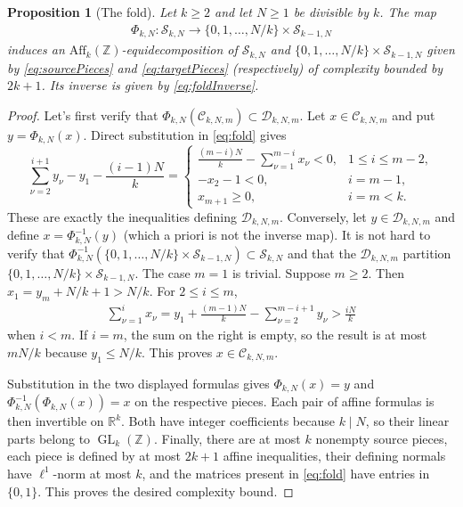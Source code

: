 \documentclass[a4paper,reqno,12pt]{amsart}
\theoremstyle{plain}
\newtheorem{proposition}[theorem]{Proposition}
\theoremstyle{plain}
\theoremstyle{remark}
\theoremstyle{plain}
\newcommand{\C}{\mathscr{C}}
\newcommand{\D}{\mathscr{D}}
\newcommand{\cS}{\mathscr{S}}
\newcommand{\RR}{\mathbb{R}}
\newcommand{\aff}{\text{Aff}}
\newcommand{\GL}{\operatorname{GL}}
\newcommand{\Z}{\mathbb{Z}}
\theoremstyle{plain}
\theoremstyle{plain}
\begin{document}
{{\begin{proposition}[The fold]\label{prop:fold}
{Let $k\geq2$ and let $N\geq1$ be divisible by $k$.}
The map
\begin{align*}
 \Phi_{k,N}:\cS_{k,N}
 \longrightarrow
 \{0,1,\ldots,N/k\}\times
{\cS_{k-1,N}}
\end{align*}
induces an $\aff_k(\Z)$-equidecomposition of $\cS_{k,N}$ and $ \{0,1,\ldots,N/k\}\times \cS_{k-1,N}$ given by \eqref{eq:sourcePieces} and \eqref{eq:targetPieces} (respectively) 
of complexity bounded by ${2k+1}$.
{Its inverse is given by \eqref{eq:foldInverse}.}
\end{proposition}

{
\begin{proof}
{Let's} first verify that $\Phi_{k,N}({\C_{k,N,m}}) \subset \D_{k,N,m}$. Let $x\in\C_{k,N,m}$ and put $y=\Phi_{k,N}(x)$. 
Direct substitution in \eqref{eq:fold} gives
\[
\sum_{\nu=2}^{i+1}y_\nu-y_1-\frac{(i-1)N}{k}
=\begin{cases}
\displaystyle\frac{(m-i)N}{k}-\sum_{\nu=1}^{m-i}x_\nu<0,
 &1\leq i\leq m-2,\\[1mm]
-x_2-1<0,&i=m-1,\\[1mm]
x_{m+1}\geq0,&i=m<k.
\end{cases}
\]
These are exactly the inequalities defining $\D_{k,N,m}$. Conversely, let $y\in\D_{k,N,m}$ and define $x=\Phi_{k,N}^{-1}(y)$ (which {a priori} is not the inverse map).  {It is not hard to verify that $\Phi_{k,N}^{-1}(\{0,1,\ldots,N/k\}\times\cS_{k-1,N})\subset\cS_{k,N}$ and that the $\D_{k,N,m}$ partition $\{0,1,\ldots,N/k\}\times\cS_{k-1,N}$.} The case $m=1$ is trivial.
Suppose $m\geq2$. Then $x_1=y_m+N/k+1>N/k$.
For $2\leq i\leq m$,
\begin{align}
\sum_{\nu=1}^{i}x_\nu
=y_1+\frac{(m-1)N}{k}
-\sum_{\nu=2}^{m-i+1}y_\nu > \frac{iN}{k}
\label{eq:recoveredSums}
\end{align}
when $i<m$. If $i=m$, the sum on the right is
empty, so the result is at most $mN/k$ because $y_1\leq N/k$.
This proves $x\in\C_{k,N,m}$.

Substitution in the two displayed formulas gives
$\Phi_{k,N}(x)=y$ and $\Phi_{k,N}^{-1}(\Phi_{k,N}(x))=x$
on the respective pieces. Each pair of affine formulas is then invertible
on $\RR^k$. Both have integer coefficients because $k\mid N$,
so their linear parts belong to $\GL_k(\Z)$.
Finally, there are at most $k$ nonempty source pieces, each piece is defined by at most ${2k+1}$ affine inequalities,  their defining
normals have $\ell^1$-norm at most $k$, and the matrices present in
\eqref{eq:fold} have entries in $\{0,1\}$. This proves the desired complexity
bound.
\end{proof}
}
}


}
\end{document}

